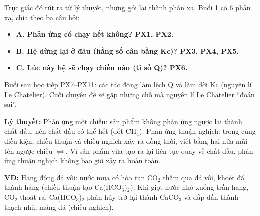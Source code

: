 Trực giác đó rút ra từ lý thuyết, nhưng gói lại thành phản xạ. Buổi 1 có 6 phản xạ, chia theo ba câu hỏi:

\begin{itemize}[leftmargin=1.5em, itemsep=1pt]
\item \textbf{A. Phản ứng có chạy hết không? PX1, PX2.}
\item \textbf{B. Hệ dừng lại ở đâu (hằng số cân bằng Kc)? PX3, PX4, PX5.}
\item \textbf{C. Lúc này hệ sẽ chạy chiều nào (tỉ số Q)? PX6.}
\end{itemize}
Buổi sau học tiếp PX7–PX11: các tác động làm lệch Q và làm dời Kc (nguyên lí Le Chatelier). Cuối chuyên đề sẽ gặp những chỗ mà nguyên lí Le Chatelier ``đoán sai''.

\textbf{Lý thuyết:} Phản ứng một chiều: sản phẩm không phản ứng ngược lại thành chất đầu, nên chất đầu có thể hết (đốt CH$_{4}$). Phản ứng thuận nghịch: trong cùng điều kiện, chiều thuận và chiều nghịch xảy ra đồng thời, viết bằng hai nửa mũi tên ngược chiều $\rightleftharpoons$. Vì sản phẩm vừa tạo ra lại liên tục quay về chất đầu, phản ứng thuận nghịch không bao giờ xảy ra hoàn toàn.

\textbf{VD:} Hang động đá vôi: nước mưa có hòa tan CO$_{2}$ thấm qua đá vôi, khoét đá thành hang (chiều thuận tạo Ca(HCO$_{3}$)$_{2}$). Khi giọt nước nhỏ xuống trần hang, CO$_{2}$ thoát ra, Ca(HCO$_{3}$)$_{2}$ phân hủy trở lại thành CaCO$_{3}$ và đắp dần thành thạch nhũ, măng đá (chiều nghịch).

